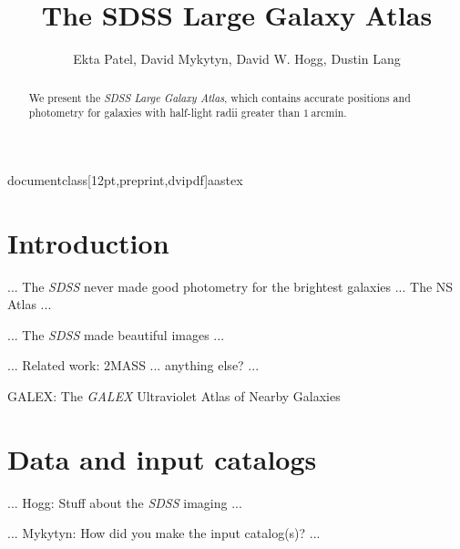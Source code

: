 documentclass[12pt,preprint,dvipdf]{aastex}
\newcommand{\project}[1]{\textsl{#1}}
\newcommand{\units}[1]{\mathrm{#1}}
\renewcommand{\mag}{\units{mag}}
\renewcommand{\arcmin}{\units{arcmin}}
\newcommand{\rfifty}{r_{50}}
\newcommand{\rninety}{r_{90}}
\newcommand{\conc}{C}



\title{
       The SDSS Large Galaxy Atlas
      }
\author{
        Ekta Patel\altaffilmark{\ref{CCPP}},
        David Mykytyn\altaffilmark{\ref{CCPP}},
        David W. Hogg\altaffilmark{\ref{CCPP},\ref{MPIA},\ref{email}},
        Dustin Lang\altaffilmark{\ref{CMU}}
       }
\setcounter{address}{1}

\begin{abstract}
We present the \project{SDSS Large Galaxy Atlas}, which contains
accurate positions and photometry for galaxies with half-light radii
greater than $1~\arcmin$.
\end{abstract}

\section{Introduction}

... The \project{SDSS} never made good photometry for the brightest galaxies ... The NS Atlas ...

... The \project{SDSS} made beautiful images ...

... Related work:  2MASS ... anything else? ...

GALEX: The \textit{GALEX} Ultraviolet Atlas of Nearby Galaxies

\section{Data and input catalogs}

... Hogg: Stuff about the \project{SDSS} imaging ...

... Mykytyn: How did you make the input catalog(s)? ...

